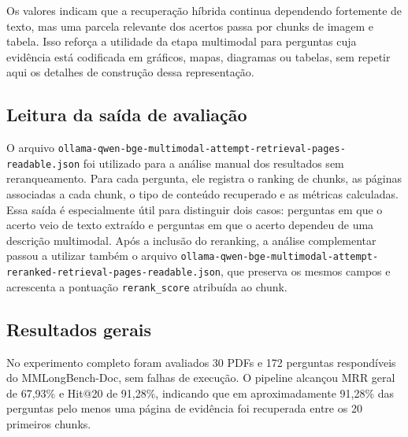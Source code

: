 Os valores indicam que a recuperação híbrida continua dependendo fortemente de texto, mas uma parcela relevante dos acertos passa por chunks de imagem e tabela. Isso reforça a utilidade da etapa multimodal para perguntas cuja evidência está codificada em gráficos, mapas, diagramas ou tabelas, sem repetir aqui os detalhes de construção dessa representação.

\subsection{Leitura da saída de avaliação}
\label{subsec:raganything-saida-avaliacao}

O arquivo \texttt{ollama-qwen-bge-multimodal-attempt-retrieval-pages-readable.json} foi utilizado para a análise manual dos resultados sem reranqueamento. Para cada pergunta, ele registra o ranking de chunks, as páginas associadas a cada chunk, o tipo de conteúdo recuperado e as métricas calculadas. Essa saída é especialmente útil para distinguir dois casos: perguntas em que o acerto veio de texto extraído e perguntas em que o acerto dependeu de uma descrição multimodal. Após a inclusão do reranking, a análise complementar passou a utilizar também o arquivo \texttt{ollama-qwen-bge-multimodal-attempt-reranked-retrieval-pages-readable.json}, que preserva os mesmos campos e acrescenta a pontuação \texttt{rerank\_score} atribuída ao chunk.

\subsection{Resultados gerais}
\label{subsec:raganything-resultados-gerais}

No experimento completo foram avaliados 30 PDFs e 172 perguntas respondíveis do MMLongBench-Doc, sem falhas de execução. O pipeline alcançou MRR geral de 67,93\% e Hit@20 de 91,28\%, indicando que em aproximadamente 91,28\% das perguntas pelo menos uma página de evidência foi recuperada entre os 20 primeiros chunks.

